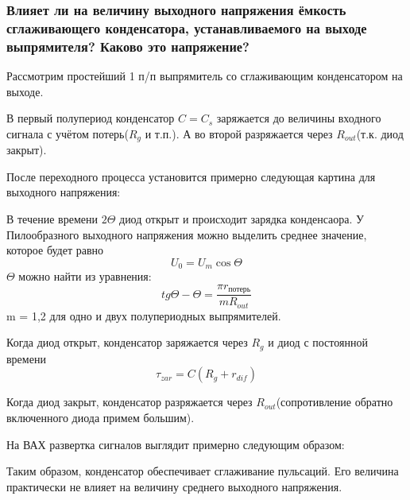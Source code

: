 \subsubsection{Влияет ли на величину выходного напряжения ёмкость сглаживающего конденсатора, устанавливаемого на выходе выпрямителя? Каково это напряжение?}

Рассмотрим простейший 1 п/п выпрямитель со сглаживающим конденсатором на выходе.
\begin{center}
	\begin{figure}[h!]
		\caption{}	
	\end{figure}
\end{center}

В первый полупериод конденсатор $C = C_{s}$ заряжается до величины входного сигнала с учётом потерь($R_g$ и т.п.). А во второй разряжается через $R_{out}$(т.к. диод закрыт).

После переходного процесса установится примерно следующая картина для выходного напряжения: 
\begin{center}
	\begin{figure}[h!]
		\caption{}	
	\end{figure}
\end{center}

В течение времени $2\Theta$ диод открыт и  происходит зарядка конденсаора. У Пилообразного выходного напряжения можно выделить среднее значение, которое будет равно 
$$
U_0 = U_m\cos\Theta
$$
$\Theta$ можно найти из уравнения:
$$
tg\Theta - \Theta = \frac{\pi r_{\textit{потерь}}}{mR_{out}}
$$
m = 1,2 для одно и двух полупериодных выпрямителей.

Когда диод открыт, конденсатор заряжается через $R_g$ и диод с постоянной времени
$$
\tau_{zar} = C(R_g + r_{dif})
$$

Когда диод закрыт, конденсатор разряжается через $R_{out}$(сопротивление обратно включенного диода примем большим).

На ВАХ развертка сигналов выглядит примерно следующим образом:
\begin{center}
	\begin{figure}[h!]
		\caption{}	
	\end{figure}
\end{center}

Таким образом, конденсатор обеспечивает сглаживание пульсаций. Его величина практически не влияет на величину среднего выходного напряжения.
\pagebreak
